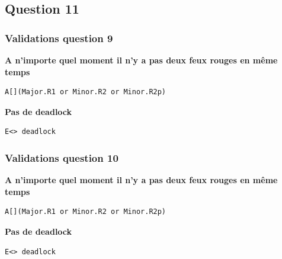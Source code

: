 \documentclass[11pt]{article}
\begin{document}
\subsection{Question 11}\label{question-11}

\subsubsection{Validations question 9}

\textbf{A n'importe quel moment il n'y a pas deux feux rouges en même temps}
\begin{verbatim}
A[](Major.R1 or Minor.R2 or Minor.R2p)
\end{verbatim}

\textbf{Pas de deadlock}
\begin{verbatim}
E<> deadlock
\end{verbatim}

\subsubsection{Validations question 10}

\textbf{A n'importe quel moment il n'y a pas deux feux rouges en même temps}
\begin{verbatim}
A[](Major.R1 or Minor.R2 or Minor.R2p)
\end{verbatim}

\textbf{Pas de deadlock}
\begin{verbatim}
E<> deadlock
\end{verbatim}
\end{document}
